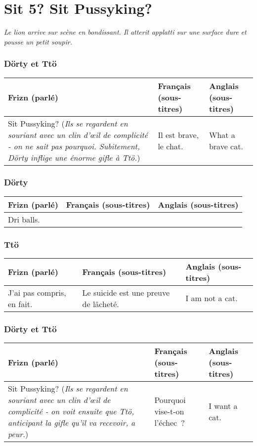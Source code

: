 \chapter*{Sit 5? Sit Pussyking?}

\emph{Le lion arrive sur scène en bondissant. Il atterit applatti sur une
surface dure et pousse un petit soupir.}
\subsection*{Dörty et Ttö}
\begin{tabular}{|p{2in}|p{2in}|p{2in}|}\hline
Frizn (parlé) & Français (sous-titres) & Anglais (sous-titres) \\\hline
Sit Pussyking? (\emph{Ils se regardent en souriant avec un clin d'œil de complicité - on
ne sait pas pourquoi. Subitement, Dörty inflige une énorme gifle à Ttö.})
&
Il est brave, le chat.&
What a brave cat.\\\hline
\end{tabular}\par
\subsection*{Dörty}
\begin{tabular}{|p{2in}|p{2in}|p{2in}|}\hline
Frizn (parlé) & Français (sous-titres) & Anglais (sous-titres) \\\hline
Dri balls.
&
&
\\\hline
\end{tabular}\par
\subsection*{Ttö}
\begin{tabular}{|p{2in}|p{2in}|p{2in}|}\hline
Frizn (parlé) & Français (sous-titres) & Anglais (sous-titres) \\\hline
J'ai pas compris, en fait.&
Le suicide est une preuve de lâcheté.&
I am not a cat.\\\hline
\end{tabular}\par
\subsection*{Dörty et Ttö}
\begin{tabular}{|p{2in}|p{2in}|p{2in}|}\hline
Frizn (parlé) & Français (sous-titres) & Anglais (sous-titres) \\\hline
Sit Pussyking? (\emph{Ils se regardent en souriant avec un clin d'œil de complicité - on
voit ensuite que Ttö, anticipant la gifle qu'il va recevoir, a peur.}) &
Pourquoi vise-t-on l'échec~? &
I want a cat.\\\hline
\end{tabular}
